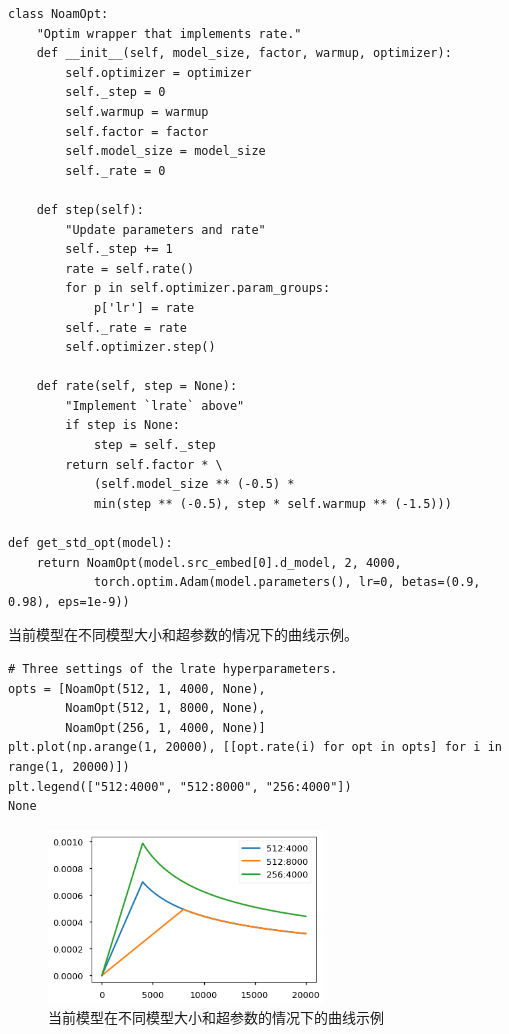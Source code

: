 \begin{Verbatim}
class NoamOpt:
    "Optim wrapper that implements rate."
    def __init__(self, model_size, factor, warmup, optimizer):
        self.optimizer = optimizer
        self._step = 0
        self.warmup = warmup
        self.factor = factor
        self.model_size = model_size
        self._rate = 0
        
    def step(self):
        "Update parameters and rate"
        self._step += 1
        rate = self.rate()
        for p in self.optimizer.param_groups:
            p['lr'] = rate
        self._rate = rate
        self.optimizer.step()
        
    def rate(self, step = None):
        "Implement `lrate` above"
        if step is None:
            step = self._step
        return self.factor * \
            (self.model_size ** (-0.5) *
            min(step ** (-0.5), step * self.warmup ** (-1.5)))
        
def get_std_opt(model):
    return NoamOpt(model.src_embed[0].d_model, 2, 4000,
            torch.optim.Adam(model.parameters(), lr=0, betas=(0.9, 0.98), eps=1e-9))
\end{Verbatim}

当前模型在不同模型大小和超参数的情况下的曲线示例。

\begin{Verbatim}
# Three settings of the lrate hyperparameters.
opts = [NoamOpt(512, 1, 4000, None), 
        NoamOpt(512, 1, 8000, None),
        NoamOpt(256, 1, 4000, None)]
plt.plot(np.arange(1, 20000), [[opt.rate(i) for opt in opts] for i in range(1, 20000)])
plt.legend(["512:4000", "512:8000", "256:4000"])
None
\end{Verbatim}

\begin{figure}[htb]
\centering 
\includegraphics[width=0.65\textwidth]{img/n6.png} 
\caption{当前模型在不同模型大小和超参数的情况下的曲线示例}
\label{Test}
\end{figure}

